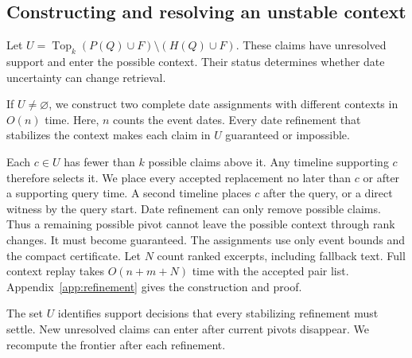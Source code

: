 \subsection{Constructing and resolving an unstable context}
Let $U=\operatorname{Top}_k(P(Q)\cup F)\setminus(H(Q)\cup F)$.
These claims have unresolved support and enter the possible context.
Their status determines whether date uncertainty can change retrieval.

\begin{theorem}
\label{thm:refinement}
If $U\ne\varnothing$, we construct two complete date assignments with different contexts in $O(n)$ time.
Here, $n$ counts the event dates.
Every date refinement that stabilizes the context makes each claim in $U$ guaranteed or impossible.
\end{theorem}

Each $c\in U$ has fewer than $k$ possible claims above it.
Any timeline supporting $c$ therefore selects it.
We place every accepted replacement no later than $c$ or after a supporting query time.
A second timeline places $c$ after the query, or a direct witness by the query start.
Date refinement can only remove possible claims.
Thus a remaining possible pivot cannot leave the possible context through rank changes.
It must become guaranteed.
The assignments use only event bounds and the compact certificate.
Let $N$ count ranked excerpts, including fallback text.
Full context replay takes $O(n+m+N)$ time with the accepted pair list.
Appendix~\ref{app:refinement} gives the construction and proof.

The set $U$ identifies support decisions that every stabilizing refinement must settle.
New unresolved claims can enter after current pivots disappear.
We recompute the frontier after each refinement.

